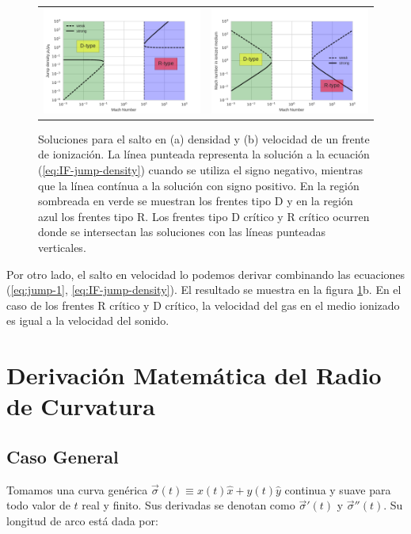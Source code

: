 \begin{figure}
  \centering
  \begin{tabular}{lr}
    \includegraphics[width=0.5\linewidth]{./Figures/IF-types} &
    \includegraphics[width=0.5\linewidth]{./Figures/IF-vel-jump}
  \end{tabular}
  \caption[Soluciones del salto de densidad y velocidad en un frente de ionización en función del número de Mach del medio neutro.]{Soluciones para el salto en (a) densidad y (b) velocidad de un frente de ionización. La línea punteada representa la solución a la ecuación (\ref{eq:IF-jump-density}) cuando se utiliza el signo negativo, mientras que la línea contínua a la solución con signo positivo. En la región sombreada en verde se muestran los frentes tipo D y en la región azul los frentes tipo R. Los frentes tipo D crítico y R crítico ocurren donde se intersectan las soluciones con las líneas punteadas verticales.}
  \label{fig:IF-jump}
\end{figure}
Por otro lado, el salto en velocidad lo podemos derivar combinando las ecuaciones (\ref{eq:jump-1}, \ref{eq:IF-jump-density}). El resultado se muestra en la figura \ref{fig:IF-jump}b. En el caso de los frentes R crítico y D crítico, la velocidad del gas en el medio ionizado es igual a la velocidad del sonido.


\chapter[Radio de Curvatura]{Derivación Matemática del Radio de Curvatura}
\label{app:math-curvature-radius}
\thispagestyle{empty}
\section{Caso General}
Tomamos una curva genérica $\vec{\sigma}(t) \equiv x(t) \hat{x} + y(t) \hat{y}$ continua y suave para todo valor de $t$ real y finito. Sus derivadas se denotan como $\vec{\sigma}'(t)$ y $\vec{\sigma}''(t)$. Su longitud de arco está dada por:

